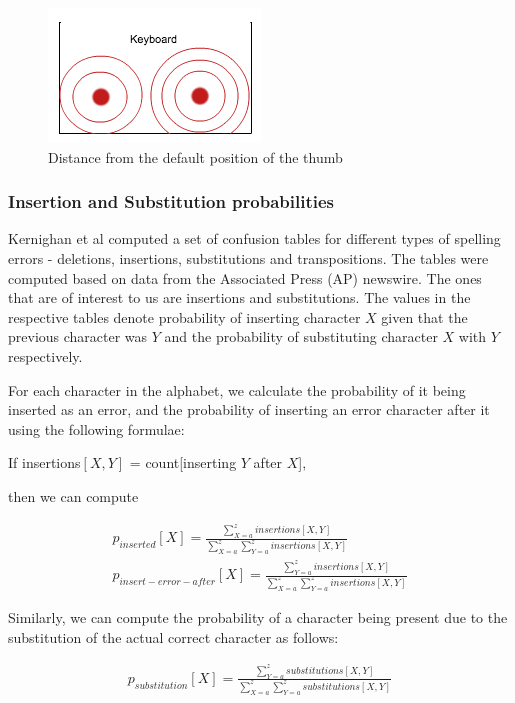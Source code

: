 \documentclass[letterpaper, 10 pt, conference]{ieeeconf}  %
\begin{document}
\begin{figure}[!h]
    \centering
    \includegraphics[scale=0.5]{heuristic3.png}
    \caption{Distance from the default position of the thumb}
    \label{fig:divfeature3}
\end{figure}

\subsubsection{Insertion and Substitution probabilities}
Kernighan et al\cite{kernighan1990spelling} computed a set of confusion tables for different types of spelling errors - deletions, insertions, substitutions and transpositions. The tables were computed based on data from the Associated Press (AP) newswire. The ones that are of interest to us are insertions and substitutions. The values in the respective tables denote probability of inserting character $X$ given that the previous character was $Y$ and the probability of substituting character $X$ with $Y$ respectively. 

For each character in the alphabet, we calculate the probability of it being inserted as an error, and the probability of inserting an error character after it using the following formulae:

If insertions$[X,Y]$ = count[inserting $Y$ after $X$],

then we can compute

\begin{align*}
p_{inserted}[X] = \frac{\sum\limits_{X=a}^{z} insertions[X,Y]}{\sum\limits_{X=a}^{z} \sum\limits_{Y=a}^{z}insertions[X,Y]}\\
p_{insert-error-after}[X] = \frac{\sum\limits_{Y=a}^{z} insertions[X,Y]}{\sum\limits_{X=a}^{z} \sum\limits_{Y=a}^{z}insertions[X,Y]}
\end{align*}

Similarly, we can compute the probability of a character being present due to the substitution of the actual correct character as follows:

\begin{align*}
p_{substitution}[X] = \frac{\sum\limits_{Y=a}^{z} substitutions[X,Y]}{\sum\limits_{X=a}^{z} \sum\limits_{Y=a}^{z}substitutions[X,Y]}
\end{align*}
\end{document}
